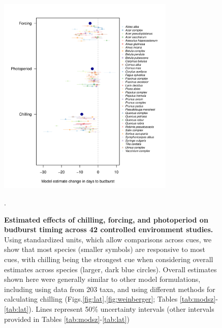 \documentclass{article}
\begin{document}
\begin{figure}[h!]
\centering
\noindent \includegraphics[width=0.75\textwidth]{..//..//analyses/bb_analysis/figures/muplotspcompexprampfputah_z.pdf}
\caption{\textbf{Estimated effects of chilling, forcing, and photoperiod on budburst timing across 42 controlled environment studies.} Using standardized units, which allow comparisons across cues, we show that most species (smaller symbols) are responsive to most cues, with chilling being the strongest cue when considering overall estimates across species (larger, dark blue circles). Overall estimates shown here were generally similar to other model formulations, including using data from 203 taxa, and using different methods for calculating chilling (Figs.\ref{fig:lat},\ref{fig:weinberger}; Tables \ref{tab:modsz}-\ref{tab:lat}). Lines represent 50\% uncertainty intervals (other intervals provided in Tables \ref{tab:modsz}-\ref{tab:lat})}.
\label{fig:mu}
\end{figure}

\newpage
\end{document}
